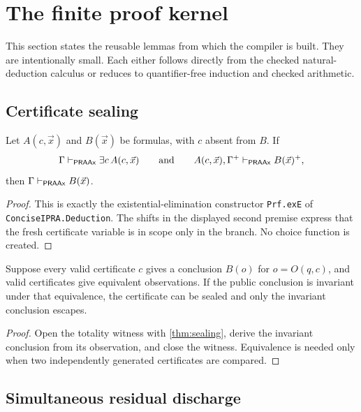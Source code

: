 \section{The finite proof kernel}
\label{sec:kernel}

This section states the reusable lemmas from which the compiler is built.
They are intentionally small.  Each either follows directly from the checked
natural-deduction calculus or reduces to quantifier-free induction and checked
arithmetic.

\subsection{Certificate sealing}

\begin{theorem}
\label{thm:sealing}
Let \(A(c,\vec x)\) and \(B(\vec x)\) be formulas, with \(c\) absent from
\(B\).  If
\[
 \Gamma\vdash_{\mathsf{PRAAx}}\exists c\,A(c,\vec x)
 \qquad\text{and}\qquad
 A(c,\vec x),\Gamma^+\vdash_{\mathsf{PRAAx}}B(\vec x)^+,
\]
then \(\Gamma\vdash_{\mathsf{PRAAx}}B(\vec x)\).
\end{theorem}

\begin{proof}
This is exactly the existential-elimination constructor \texttt{Prf.exE} of
\texttt{ConciseIPRA.Deduction}.  The shifts in the displayed second premise
express that the fresh certificate variable is in scope only in the branch.
No choice function is created.
\end{proof}

\begin{corollary}
Suppose every valid certificate \(c\) gives a conclusion \(B(o)\) for
\(o=O(q,c)\), and valid certificates give equivalent observations.  If the
public conclusion is invariant under that equivalence, the certificate can be
sealed and only the invariant conclusion escapes.
\end{corollary}

\begin{proof}
Open the totality witness with \cref{thm:sealing}, derive the invariant
conclusion from its observation, and close the witness.  Equivalence is needed
only when two independently generated certificates are compared.
\end{proof}

\subsection{Simultaneous residual discharge}

